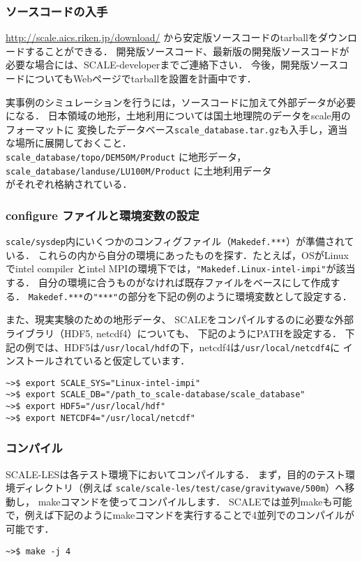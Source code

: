 \subsubsection{ソースコードの入手}
\url{http://scale.aics.riken.jp/download/} から安定版ソースコードのtarballをダウンロードすることができる．
開発版ソースコード、最新版の開発版ソースコードが必要な場合には、SCALE-developerまでご連絡下さい．
今後，開発版ソースコードについてもWebページでtarballを設置を計画中です．

実事例のシミュレーションを行うには，ソースコードに加えて外部データが必要になる．
日本領域の地形，土地利用については国土地理院のデータをscale用のフォーマットに
変換したデータベース\verb|scale_database.tar.gz|も入手し，適当な場所に展開しておくこと．\\
\verb|scale_database/topo/DEM50M/Product| に地形データ，\\
\verb|scale_database/landuse/LU100M/Product| に土地利用データ\\
がそれぞれ格納されている．


\subsubsection{configure ファイルと環境変数の設定}
\verb|scale/sysdep|内にいくつかのコンフィグファイル（\verb|Makedef.***|）が準備されている．
これらの内から自分の環境にあったものを探す．たとえば，OSがLinuxでintel compiler
とintel MPIの環境下では，\verb|"Makedef.Linux-intel-impi"|が該当する．
自分の環境に合うものがなければ既存ファイルをベースにして作成する．
\verb|Makedef.***|の\verb|"***"|の部分を下記の例のように環境変数として設定する．

また、現実実験のための地形データ、
SCALEをコンパイルするのに必要な外部ライブラリ（HDF5, netcdf4）についても、
下記のようにPATHを設定する．
下記の例では、HDF5は\verb|/usr/local/hdf|の下，netcdf4は\verb|/usr/local/netcdf4|に
インストールされていると仮定しています．

\begin{verbatim}
~>$ export SCALE_SYS="Linux-intel-impi"
~>$ export SCALE_DB="/path_to_scale-database/scale_database"
~>$ export HDF5="/usr/local/hdf"
~>$ export NETCDF4="/usr/local/netcdf"
\end{verbatim}



\subsubsection{コンパイル}
SCALE-LESは各テスト環境下においてコンパイルする．
まず，目的のテスト環境ディレクトリ（例えば \verb|scale/scale-les/test/case/gravitywave/500m|）へ移動し，
makeコマンドを使ってコンパイルします．
SCALEでは並列makeも可能で，例えば下記のようにmakeコマンドを実行することで4並列でのコンパイルが可能です．
\begin{verbatim}
~>$ make -j 4
\end{verbatim}

